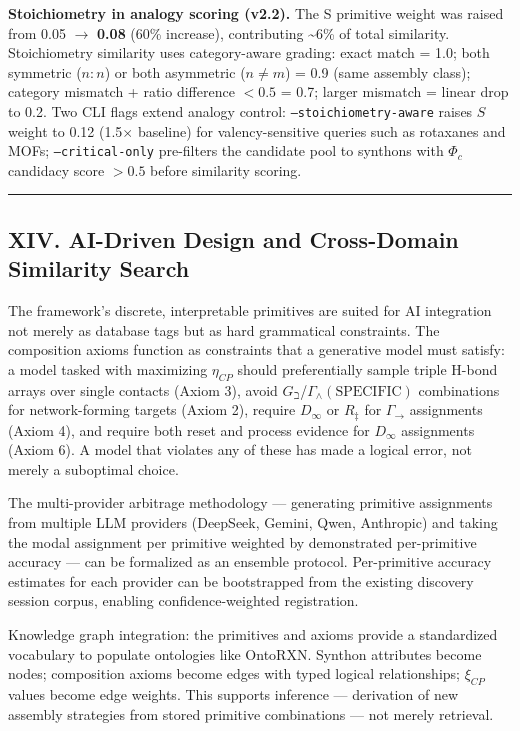 \documentclass[12pt,a4paper]{article}
\begin{document}
\textbf{Stoichiometry in analogy scoring (v2.2).} The S primitive weight was raised from 0.05 $\to$ \textbf{0.08} (60\% increase), contributing \textasciitilde{}6\% of total similarity. Stoichiometry similarity uses category-aware grading: exact match = 1.0; both symmetric ($n:n$) or both asymmetric ($n \neq m$) = 0.9 (same assembly class); category mismatch + ratio difference $< 0.5$ = 0.7; larger mismatch = linear drop to 0.2. Two CLI flags extend analogy control: \texttt{--stoichiometry-aware} raises $S$ weight to 0.12 (1.5$\times$ baseline) for valency-sensitive queries such as rotaxanes and MOFs; \texttt{--critical-only} pre-filters the candidate pool to synthons with $\Phi_c$ candidacy score $> 0.5$ before similarity scoring.

\begin{center}
\rule{0.5\textwidth}{0.4pt}
\end{center}

\subsection{XIV. AI-Driven Design and Cross-Domain Similarity Search}

The framework's discrete, interpretable primitives are suited for AI integration not merely as database tags but as hard grammatical constraints. The composition axioms function as constraints that a generative model must satisfy: a model tasked with maximizing $\eta_{CP}$ should preferentially sample triple H-bond arrays over single contacts (Axiom 3), avoid $G_{\beth}$/$\Gamma_{\wedge}(\text{SPECIFIC})$ combinations for network-forming targets (Axiom 2), require $D_{\infty}$ or $R_{\ddagger}$ for $\Gamma_{\to}$ assignments (Axiom 4), and require both reset and process evidence for $D_{\infty}$ assignments (Axiom 6). A model that violates any of these has made a logical error, not merely a suboptimal choice.

The multi-provider arbitrage methodology --- generating primitive assignments from multiple LLM providers (DeepSeek, Gemini, Qwen, Anthropic) and taking the modal assignment per primitive weighted by demonstrated per-primitive accuracy --- can be formalized as an ensemble protocol. Per-primitive accuracy estimates for each provider can be bootstrapped from the existing discovery session corpus, enabling confidence-weighted registration.

Knowledge graph integration: the primitives and axioms provide a standardized vocabulary to populate ontologies like OntoRXN. Synthon attributes become nodes; composition axioms become edges with typed logical relationships; $\xi_{CP}$ values become edge weights. This supports inference --- derivation of new assembly strategies from stored primitive combinations --- not merely retrieval.
\end{document}
